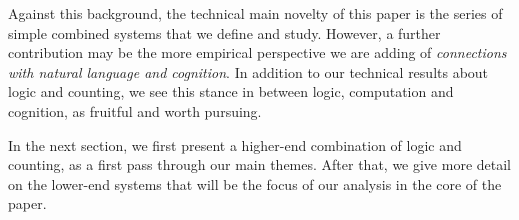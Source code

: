\documentclass[12pt,oneside,reqno]{amsart}
\theoremstyle{definition}
\begin{document}
\vspace{1ex}

Against this background, the technical main novelty of this paper is the series of simple combined systems that we define and study. However, a further contribution may be the more empirical perspective we are adding of \emph{connections with natural language and cognition}. In addition to our technical results about logic and counting, we see this stance in between logic, computation and cognition, as fruitful and worth pursuing. 

\vspace{1ex}

In the next section, we first present a higher-end combination of logic and counting, as a first pass through our main themes. After that, we give more detail on the lower-end systems that will be the focus of our analysis in the core of the paper.




\end{document}
